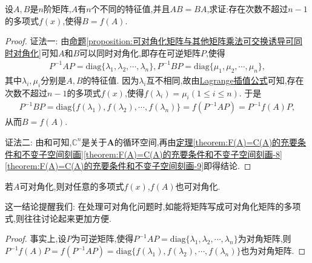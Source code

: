 \documentclass[../../main.tex]{subfiles}%
\begin{document}
\begin{proposition}\label{proposition:有n个不同特征值的矩阵乘法可交换诱导多项式表示}
设$A,B$是$n$阶矩阵,$A$有$n$个不同的特征值,并且$AB = BA$,求证:存在次数不超过$n - 1$的多项式$f(x)$,使得$B = f(A)$.
\end{proposition}
\begin{proof}

{\color{blue}证法一:}
由\hyperref[proposition:可对角化矩阵与其他矩阵乘法可交换诱导可同时对角化]{命题\ref{proposition:可对角化矩阵与其他矩阵乘法可交换诱导可同时对角化}}可知$A$和$B$可以同时对角化,即存在可逆矩阵$P$,使得
\begin{align*}
P^{-1}AP=\mathrm{diag}\{\lambda_1,\lambda_2,\cdots,\lambda_n\}, P^{-1}BP=\mathrm{diag}\{\mu_1,\mu_2,\cdots,\mu_n\},
\end{align*}
其中$\lambda_i,\mu_i$分别是$A,B$的特征值. 因为$\lambda_i$互不相同,故由\hyperref[theorem:Lagrange插值公式]{Lagrange插值公式}可知,存在次数不超过$n - 1$的多项式$f(x)$,使得$f(\lambda_i)=\mu_i(1\leqslant  i\leqslant  n)$. 于是
\begin{align*}
P^{-1}BP=\mathrm{diag}\{f(\lambda_1),f(\lambda_2),\cdots,f(\lambda_n)\}=f(P^{-1}AP)=P^{-1}f(A)P,
\end{align*}
从而$B = f(A)$.

{\color{blue}证法二:}
由和可知,$\mathbb{C}^n$是关于$\mathbf{A}$的循环空间,再由\hyperref[theorem:F(A)=C(A)的充要条件和不变子空间刻画]{定理\ref{theorem:F(A)=C(A)的充要条件和不变子空间刻画}\ref{theorem:F(A)=C(A)的充要条件和不变子空间刻画-8}\ref{theorem:F(A)=C(A)的充要条件和不变子空间刻画-9}}即得结论.
\end{proof}

\begin{proposition}\label{proposition:矩阵A可对角化则f(A)也可对角化}
若$A$可对角化,则对任意的多项式$f(x)$,$f(A)$也可对角化.
\end{proposition}
\begin{note}
这一结论提醒我们: 在处理可对角化问题时,如能将矩阵写成可对角化矩阵的多项式,则往往讨论起来更加方便.
\end{note}
\begin{proof}
事实上,设$P$为可逆矩阵,使得$P^{-1}AP=\mathrm{diag}\{\lambda_1,\lambda_2,\cdots,\lambda_n\}$为对角矩阵,则$P^{-1}f(A)P=f(P^{-1}AP)=\mathrm{diag}\{f(\lambda_1),f(\lambda_2),\cdots,f(\lambda_n)\}$也为对角矩阵.
\end{proof}
\end{document}
